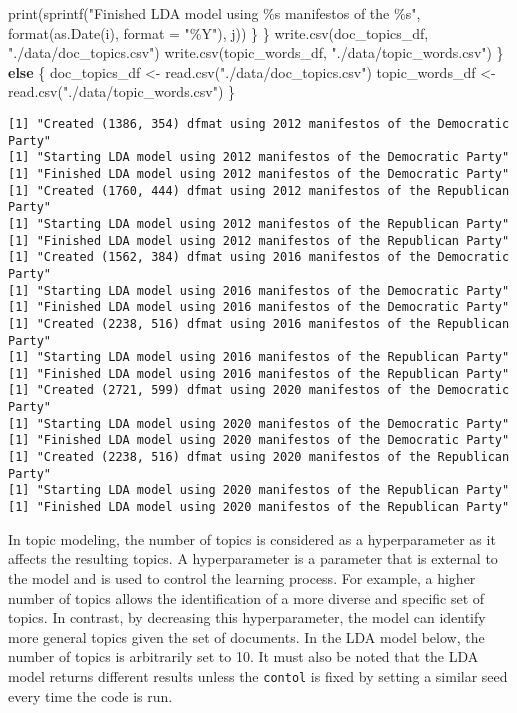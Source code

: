 \documentclass[
]{article}
\newenvironment{Shaded}{\begin{snugshade}}{\end{snugshade}}
\newcommand{\AttributeTok}[1]{\textcolor[rgb]{0.77,0.63,0.00}{#1}}
\newcommand{\ControlFlowTok}[1]{\textcolor[rgb]{0.13,0.29,0.53}{\textbf{#1}}}
\newcommand{\FunctionTok}[1]{\textcolor[rgb]{0.00,0.00,0.00}{#1}}
\newcommand{\NormalTok}[1]{#1}
\newcommand{\OtherTok}[1]{\textcolor[rgb]{0.56,0.35,0.01}{#1}}
\newcommand{\StringTok}[1]{\textcolor[rgb]{0.31,0.60,0.02}{#1}}
\begin{document}
\begin{Shaded}
\begin{Highlighting}[]
      \FunctionTok{print}\NormalTok{(}\FunctionTok{sprintf}\NormalTok{(}\StringTok{"Finished LDA model using \%s manifestos of the \%s"}\NormalTok{, }
                    \FunctionTok{format}\NormalTok{(}\FunctionTok{as.Date}\NormalTok{(i), }\AttributeTok{format =} \StringTok{"\%Y"}\NormalTok{), j))}
\NormalTok{    \}}
\NormalTok{  \}}
  \FunctionTok{write.csv}\NormalTok{(doc\_topics\_df, }\StringTok{"./data/doc\_topics.csv"}\NormalTok{)}
  \FunctionTok{write.csv}\NormalTok{(topic\_words\_df, }\StringTok{"./data/topic\_words.csv"}\NormalTok{)}
\NormalTok{\} }\ControlFlowTok{else}\NormalTok{ \{}
\NormalTok{  doc\_topics\_df }\OtherTok{\textless{}{-}} \FunctionTok{read.csv}\NormalTok{(}\StringTok{"./data/doc\_topics.csv"}\NormalTok{)}
\NormalTok{  topic\_words\_df }\OtherTok{\textless{}{-}} \FunctionTok{read.csv}\NormalTok{(}\StringTok{"./data/topic\_words.csv"}\NormalTok{)}
\NormalTok{\}}
\end{Highlighting}
\end{Shaded}

\begin{verbatim}
[1] "Created (1386, 354) dfmat using 2012 manifestos of the Democratic Party"
[1] "Starting LDA model using 2012 manifestos of the Democratic Party"
[1] "Finished LDA model using 2012 manifestos of the Democratic Party"
[1] "Created (1760, 444) dfmat using 2012 manifestos of the Republican Party"
[1] "Starting LDA model using 2012 manifestos of the Republican Party"
[1] "Finished LDA model using 2012 manifestos of the Republican Party"
[1] "Created (1562, 384) dfmat using 2016 manifestos of the Democratic Party"
[1] "Starting LDA model using 2016 manifestos of the Democratic Party"
[1] "Finished LDA model using 2016 manifestos of the Democratic Party"
[1] "Created (2238, 516) dfmat using 2016 manifestos of the Republican Party"
[1] "Starting LDA model using 2016 manifestos of the Republican Party"
[1] "Finished LDA model using 2016 manifestos of the Republican Party"
[1] "Created (2721, 599) dfmat using 2020 manifestos of the Democratic Party"
[1] "Starting LDA model using 2020 manifestos of the Democratic Party"
[1] "Finished LDA model using 2020 manifestos of the Democratic Party"
[1] "Created (2238, 516) dfmat using 2020 manifestos of the Republican Party"
[1] "Starting LDA model using 2020 manifestos of the Republican Party"
[1] "Finished LDA model using 2020 manifestos of the Republican Party"
\end{verbatim}

In topic modeling, the number of topics is considered as a
hyperparameter as it affects the resulting topics. A hyperparameter is a
parameter that is external to the model and is used to control the
learning process. For example, a higher number of topics allows the
identification of a more diverse and specific set of topics. In
contrast, by decreasing this hyperparameter, the model can identify more
general topics given the set of documents. In the LDA model below, the
number of topics is arbitrarily set to 10. It must also be noted that
the LDA model returns different results unless the \texttt{contol} is
fixed by setting a similar seed every time the code is run.
\end{document}
